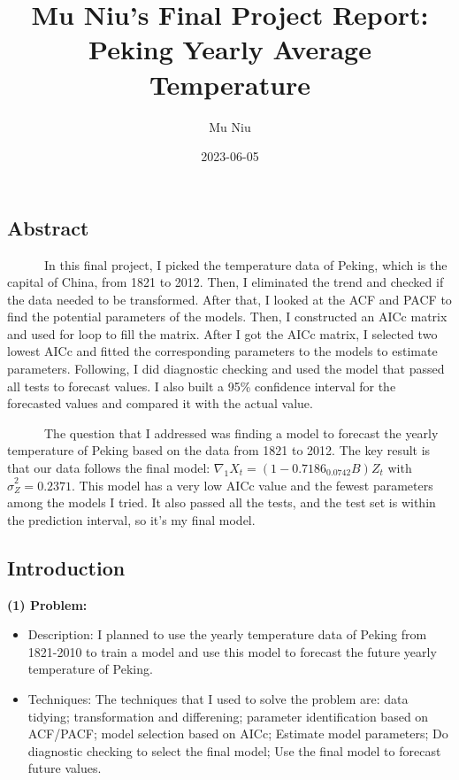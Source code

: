 \documentclass[
]{article}
\title{Mu Niu's Final Project Report: Peking Yearly Average Temperature}
\author{Mu Niu}
\date{2023-06-05}
\begin{document}
\maketitle

\hypertarget{abstract}{%
\subsection{Abstract}\label{abstract}}

~~~~~~In this final project, I picked the temperature data of Peking,
which is the capital of China, from 1821 to 2012. Then, I eliminated the
trend and checked if the data needed to be transformed. After that, I
looked at the ACF and PACF to find the potential parameters of the
models. Then, I constructed an AICc matrix and used for loop to fill the
matrix. After I got the AICc matrix, I selected two lowest AICc and
fitted the corresponding parameters to the models to estimate
parameters. Following, I did diagnostic checking and used the model that
passed all tests to forecast values. I also built a 95\% confidence
interval for the forecasted values and compared it with the actual
value.

~~~~~~The question that I addressed was finding a model to forecast the
yearly temperature of Peking based on the data from 1821 to 2012. The
key result is that our data follows the final model:
\(\nabla_1X_t = (1-0.7186_{0.0742}B)Z_t\) with
\(\hat{\sigma}^2_Z = 0.2371\). This model has a very low AICc value and
the fewest parameters among the models I tried. It also passed all the
tests, and the test set is within the prediction interval, so it's my
final model.

\hypertarget{introduction}{%
\subsection{Introduction}\label{introduction}}

\textbf{(1) Problem:}

\begin{itemize}
\item
  Description: I planned to use the yearly temperature data of Peking
  from 1821-2010 to train a model and use this model to forecast the
  future yearly temperature of Peking.
\item
  Techniques: The techniques that I used to solve the problem are: data
  tidying; transformation and differening; parameter identification
  based on ACF/PACF; model selection based on AICc; Estimate model
  parameters; Do diagnostic checking to select the final model; Use the
  final model to forecast future values.
\end{itemize}
\end{document}
